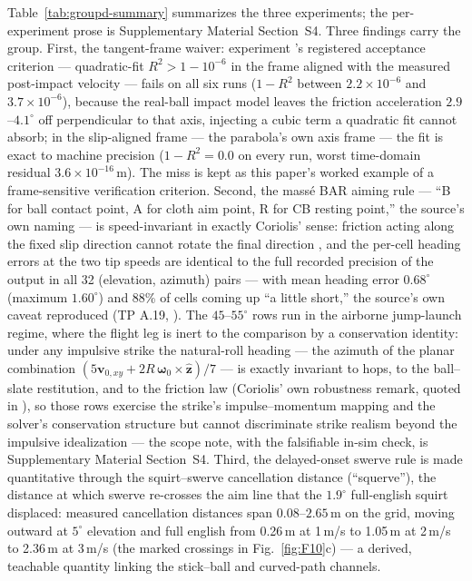 Table~\ref{tab:groupd-summary} summarizes the three experiments; the
per-experiment prose is Supplementary Material Section~S4. Three
findings carry the group. First, the tangent-frame waiver: experiment
's registered acceptance criterion --- quadratic-fit
$R^2 > 1 - 10^{-6}$ in the frame aligned with the measured post-impact
velocity --- fails on all six runs ($1 - R^2$ between $2.2\times10^{-6}$
and $3.7\times10^{-6}$), because the real-ball impact model leaves the
friction acceleration $2.9$--$4.1^\circ$ off perpendicular to that axis,
injecting a cubic term a quadratic fit cannot absorb; in the
slip-aligned frame --- the parabola's own axis frame --- the fit is
exact to machine precision ($1 - R^2 = 0.0$ on every run, worst
time-domain residual $3.6\times10^{-16}$\,m). The miss is kept as this
paper's worked example of a frame-sensitive verification criterion. Second, the mass\'e BAR
aiming rule --- ``B for ball contact point, A for cloth aim point, R for
CB resting point,'' the source's own naming \citep{alciatore_faq} --- is
speed-invariant in exactly Coriolis' sense:
friction acting along the fixed slip direction cannot rotate the final
direction \citep{coriolis1835}, and the per-cell heading errors at the
two tip speeds are identical to the full recorded precision of the
output in all 32 (elevation, azimuth) pairs --- with mean heading error
$0.68^\circ$ (maximum $1.60^\circ$) and 88\% of cells coming up ``a
little short,'' the source's own caveat reproduced (TP A.19,
\citealp{alciatore_tp_catalog}). The $45$--$55^\circ$ rows run in the
airborne jump-launch regime, where the flight leg is inert to the
comparison by a conservation identity: under any impulsive strike the
natural-roll heading --- the azimuth of the planar combination
$(5\mathbf{v}_{0,xy} +
2R\,\boldsymbol{\omega}_0\times\hat{\mathbf{z}})/7$ --- is exactly
invariant to hops, to the ball--slate restitution, and to the friction
law (Coriolis' own robustness remark, quoted in
\citealp{bouleau2006coriolis}), so those rows
exercise the strike's impulse--momentum mapping and the solver's
conservation structure but cannot discriminate strike realism beyond the
impulsive idealization --- the scope note, with the falsifiable in-sim
check, is Supplementary Material Section~S4. Third, the delayed-onset swerve rule is
made quantitative through the squirt--swerve cancellation distance
(``squerve''), the distance at which swerve re-crosses the aim line
that the $1.9^\circ$ full-english squirt displaced: measured
cancellation distances span $0.08$--$2.65$\,m on the grid, moving
outward at $5^\circ$ elevation and full english from 0.26\,m at 1\,m/s
to 1.05\,m at 2\,m/s to 2.36\,m at 3\,m/s (the marked crossings in
Fig.~\ref{fig:F10}c) --- a derived, teachable quantity linking the
stick--ball and curved-path channels.

